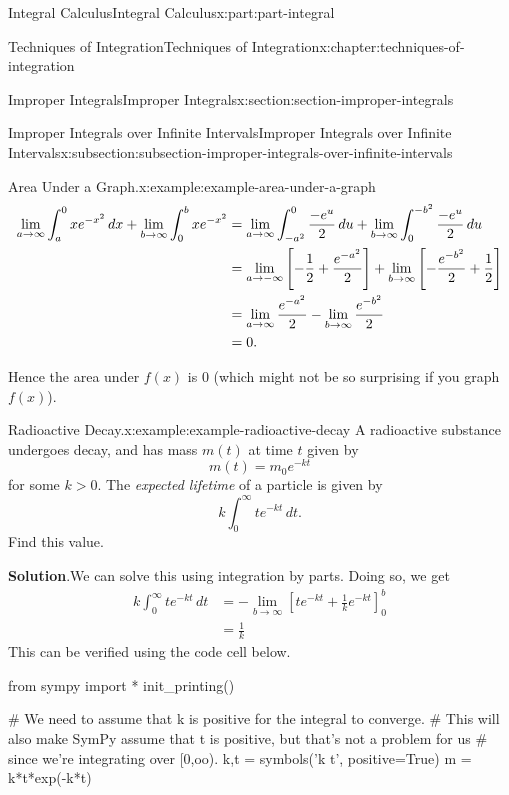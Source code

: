 \documentclass[twoside,10pt,]{book}
\newcommand{\blocktitlefont}{\relax}
\numberwithin{equation}{part}
\newcommand{\gt}{>}
\begin{document}
\begin{partptx}{Integral Calculus}{}{Integral Calculus}{}{}{x:part:part-integral}
\begin{chapterptx}{Techniques of Integration}{}{Techniques of Integration}{}{}{x:chapter:techniques-of-integration}
\begin{sectionptx}{Improper Integrals}{}{Improper Integrals}{}{}{x:section:section-improper-integrals}
\begin{subsectionptx}{Improper Integrals over Infinite Intervals}{}{Improper Integrals over Infinite Intervals}{}{}{x:subsection:subsection-improper-integrals-over-infinite-intervals}
\begin{example}{Area Under a Graph.}{x:example:example-area-under-a-graph}
\begin{align*}
\lim_{a\to\-\infty}\int_{a}^{0}xe^{-x^{2}}\,dx + \lim_{b\to\infty}\int_{0}^{b}xe^{-x^{2}} & = \lim_{a\to\-\infty}\int_{-a^{2}}^{0}\frac{-e^{u}}{2}\,du + \lim_{b\to\infty}\int_{0}^{-b^{2}}\frac{-e^{u}}{2}\,du \\
& = \lim_{a\to-\infty}\left[-\frac{1}{2} + \frac{e^{-a^{2}}}{2}\right] + \lim_{b\to\infty}\left[-\frac{e^{-b^{2}}}{2} + \frac{1}{2}\right]\\
& = \lim_{a\to\infty}\frac{e^{-a^{2}}}{2} - \lim_{b\to\infty}\frac{e^{-b^{2}}}{2} \\
& = 0. 
\end{align*}
%
\par
Hence the area under \(f(x)\) is \(0\) (which might not be so surprising if you graph \(f(x)\)).%
\end{example}
\begin{example}{Radioactive Decay.}{x:example:example-radioactive-decay}%
A radioactive substance undergoes decay, and has mass \(m(t)\) at time \(t\) given by%
\begin{equation*}
m(t) = m_{0}e^{-kt}
\end{equation*}
for some \(k\gt0\). The \emph{expected lifetime} of a particle is given by%
\begin{equation*}
k\int_{0}^{\infty}te^{-kt}\,dt.
\end{equation*}
Find this value.%
\par\smallskip%
\noindent\textbf{\blocktitlefont Solution}.\hypertarget{g:solution:idm35150998891200}{}\quad{}We can solve this using integration by parts. Doing so, we get%
\begin{align*}
k\int_{0}^{\infty}te^{-kt}\,dt & = -\lim_{b\to\infty}\left[te^{-kt} + \frac{1}{k}e^{-kt}\right]_{0}^{b} \\
& = \frac{1}{k} 
\end{align*}
This can be verified using the code cell below.%
\end{example}
\begin{sageinput}
from sympy import *
init_printing()

# We need to assume that k is positive for the integral to converge.
# This will also make SymPy assume that t is positive, but that's not a problem for us
# since we're integrating over [0,oo).
k,t = symbols('k t', positive=True)
m = k*t*exp(-k*t)


\end{sageinput}
\end{subsectionptx}
\end{sectionptx}
\end{chapterptx}
\end{partptx}
\end{document}
